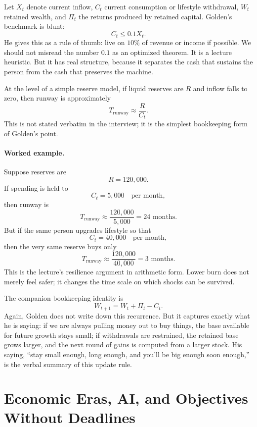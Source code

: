 Let \(X_t\) denote current inflow, \(C_t\) current consumption or lifestyle withdrawal, \(W_t\) retained wealth, and \(\Pi_t\) the returns produced by retained capital. Golden's benchmark is blunt:
\begin{equation}
C_t \le 0.1X_t.
\end{equation}
He gives this as a rule of thumb: live on \(10\%\) of revenue or income if possible. We should not misread the number \(0.1\) as an optimized theorem. It is a lecture heuristic. But it has real structure, because it separates the cash that sustains the person from the cash that preserves the machine.

At the level of a simple reserve model, if liquid reserves are \(R\) and inflow falls to zero, then runway is approximately
\begin{equation}
T_{\mathrm{runway}} \approx \frac{R}{C_t}.
\end{equation}
This is not stated verbatim in the interview; it is the simplest bookkeeping form of Golden's point.

\paragraph{Worked example.}
Suppose reserves are
\[
R=120{,}000.
\]
If spending is held to
\[
C_t=5{,}000 \quad \text{per month},
\]
then runway is
\[
T_{\mathrm{runway}} \approx \frac{120{,}000}{5{,}000}=24 \text{ months}.
\]
But if the same person upgrades lifestyle so that
\[
C_t=40{,}000 \quad \text{per month},
\]
then the very same reserve buys only
\[
T_{\mathrm{runway}} \approx \frac{120{,}000}{40{,}000}=3 \text{ months}.
\]
This is the lecture's resilience argument in arithmetic form. Lower burn does not merely feel safer; it changes the time scale on which shocks can be survived.

The companion bookkeeping identity is
\begin{equation}
W_{t+1}=W_t+\Pi_t-C_t.
\end{equation}
Again, Golden does not write down this recurrence. But it captures exactly what he is saying: if we are always pulling money out to buy things, the base available for future growth stays small; if withdrawals are restrained, the retained base grows larger, and the next round of gains is computed from a larger stock. His saying, ``stay small enough, long enough, and you'll be big enough soon enough,'' is the verbal summary of this update rule.

\section{Economic Eras, AI, and Objectives Without Deadlines}

